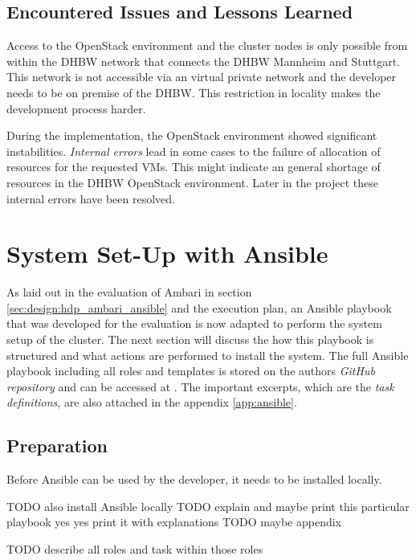 \subsection{Encountered Issues and Lessons Learned}

Access to the OpenStack environment and the cluster nodes is only possible from within the \ac{DHBW} network that connects the \ac{DHBW} Mannheim and Stuttgart.
This network is not accessible via an virtual private network and the developer needs to be on premise of the \ac{DHBW}. This restriction in locality makes the development process harder.

During the implementation, the OpenStack environment showed significant instabilities.
\emph{Internal errors} lead in some cases to the failure of allocation of resources for the requested \acp{VM}.
This might indicate an general shortage of resources in the \ac{DHBW} OpenStack environment. Later in the project these internal errors have been resolved.

\section{System Set-Up with Ansible}

As laid out in the evaluation of Ambari in section \vref{sec:design:hdp_ambari_ansible} 
and the execution plan, 
an Ansible playbook that was developed for the evaluation is now adapted to perform the system setup of the cluster. 
The next section will discuss the how this playbook is structured and what actions are performed to install the system.
The full Ansible playbook including all roles and templates is stored on the authors \emph{GitHub repository} and can be accessed at 
.
The important excerpts, which are the \emph{task definitions}, are also attached in the appendix \vref{app:ansible}.

\subsection{Preparation}

Before Ansible can be used by the developer, it needs to be installed locally.


TODO also install Ansible locally
TODO explain and maybe print this particular playbook yes yes print it with explanations
TODO maybe appendix

TODO describe all roles and task within those roles

